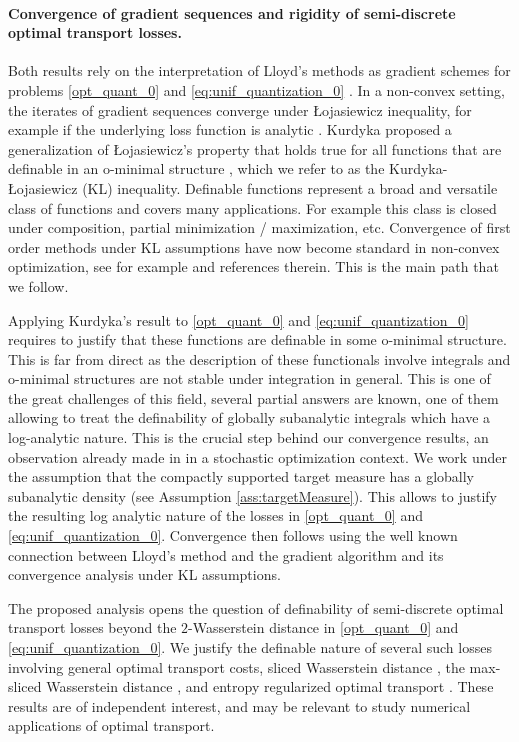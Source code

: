 \documentclass[11pt]{article}
\newcommand{\1}{\mathbbm{1}}
\numberwithin{equation}{section}
\begin{document}
\paragraph{Convergence of gradient sequences and rigidity of semi-discrete optimal transport losses.} 
Both results rely on the interpretation of Lloyd's methods as gradient schemes for problems \eqref{opt_quant_0} and \eqref{eq:unif_quantization_0} \cite{Lloydoptcvonedimlogconcave2,nonassymptotic}. In a non-convex setting, the iterates of gradient sequences converge under \L{ojasiewicz} inequality, for example if the underlying loss function is analytic \cite{AbsMahAnd2005}. Kurdyka proposed a generalization of \L{ojasiewicz}'s property that holds true for all functions that are definable in an o-minimal structure \cite{KurdykaarticleominimpliqueKL}, which we refer to as the Kurdyka-\L{ojasiewicz} (KL) inequality. Definable functions represent a broad and versatile class of functions and covers many applications. For example this class is closed under composition, partial minimization / maximization, etc. Convergence of first order methods under KL assumptions have now become standard in non-convex optimization, see for example \cite{attouch2013convergence,bolte2014proximal} and references therein. This is the main path that we follow.

Applying Kurdyka's result to \eqref{opt_quant_0} and \eqref{eq:unif_quantization_0} requires to justify that these functions are definable in some o-minimal structure. This is far from direct as the description of these functionals involve integrals and o-minimal structures are not stable under integration in general. This is one of the great challenges of this field, several partial answers are known, one of them allowing to treat the definability of globally subanalytic integrals \cite{lion1998integration,comte2000nature,Cluckers2009StabilityUI} which have a log-analytic nature. This is the crucial step behind our convergence results, an observation already made in \cite{bolte2023subgradient} in a stochastic optimization context. We work under the assumption that the compactly supported target measure has a globally subanalytic density (see Assumption \ref{ass:targetMeasure}). This allows to justify the resulting log analytic nature of the losses in \eqref{opt_quant_0} and \eqref{eq:unif_quantization_0}. Convergence then follows using the well known connection between Lloyd's method and the gradient algorithm and its convergence analysis under KL assumptions.

The proposed analysis opens the question of definability of semi-discrete optimal transport losses beyond the $2$-Wasserstein distance in \eqref{opt_quant_0} and \eqref{eq:unif_quantization_0}. We justify the definable nature of several such losses involving general optimal transport costs, sliced Wasserstein distance \cite{rabin2012wasserstein,slicedradonbarycenter,bobkov2019one}, the max-sliced Wasserstein distance \cite{kolouri2019generalized,deshpande2019max}, and entropy regularized optimal transport \cite{cuturi2013sinkhorn}. These results are of independent interest, and may be relevant to study numerical applications of optimal transport.
\end{document}
